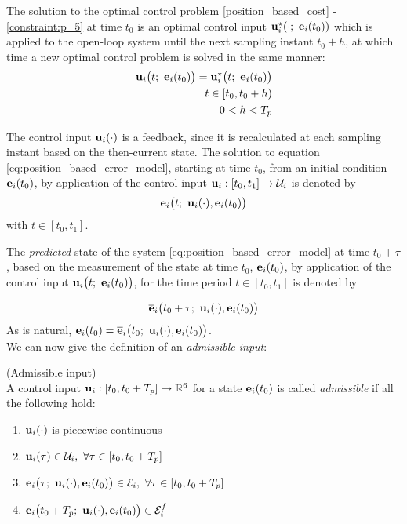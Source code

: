 The solution to the optimal control problem \eqref{position_based_cost} -
\eqref{constraint:p_5} at time $t_0$ is an optimal control input
$\bm{\mathbf{u}}_i^{\star}(\cdot;\ \bm{\mathbf{e}}_i(t_0))$ which
is applied to the open-loop system until the next sampling instant $t_0 + h$,
at which time a new optimal control problem is solved in the same manner:
\begin{align}
  \vect{u}_i\big(t;\ \vect{e}_i(t_0)\big) = \vect{u}_i^{\star}\big(t;\ \vect{e}_i(t_0)\big) \label{eq:position_based_optimal_u} \\
  t \in [t_0, t_0 + h) \nonumber \\
  0 < h < T_p \nonumber
\end{align}

The control input $\bm{\mathbf{u}}_i(\cdot)$ is a feedback, since it is
recalculated at each sampling instant based on the then-current state. The
solution to equation \eqref{eq:position_based_error_model}, starting at time
$t_0$, from an initial condition $\bm{\mathbf{e}}_i(t_0)$, by application of the
control input $\bm{\mathbf{u}}_i : [t_0, t_1] \to \mathcal{U}_i$ is denoted by
$$\bm{\mathbf{e}}_i\big(t;\ \bm{\mathbf{u}}_i(\cdot), \bm{\mathbf{e}}_i(t_0)\big)$$
with $t \in [t_0, t_1]$.

The \textit{predicted} state of the system \eqref{eq:position_based_error_model}
at time $t_0 + \tau$, based on the measurement of the state at time
$t_0$, $\bm{\mathbf{e}}_i(t_0)$, by application of the control input
$\vect{u}_i\big(t;\ \vect{e}_i(t_0)\big)$, for the time period $t \in [t_0, t_1]$
is denoted by

\begin{align}
  \overline{\bm{\mathbf{e}}}_i\big(t_0 + \tau;\ \bm{\mathbf{u}}_i(\cdot), \bm{\mathbf{e}}_i(t_0)\big) \label{eq:position_based_predicted_error_0}
\end{align}
As is natural,
$\vect{e}_i(t_0) = \overline{\vect{e}}_i\big(t_0;\ \vect{u}_i(\cdot), \vect{e}_i(t_0)\big)$.\\

We can now give the definition of an \textit{admissible input}:

\begin{bw_box}
\begin{definition} (Admissible input)\\

  A control input $\bm{\mathbf{u}}_i : [t_0, t_0 + T_p] \to \mathbb{R}^6$ for a state
  $\bm{\mathbf{e}}_i(t_0)$ is called \textit{admissible} if all the following hold:

  \begin{enumerate}
    \item $\bm{\mathbf{u}}_i(\cdot)$ is piecewise continuous
    \item $\vect{u}_i(\tau) \in \mathcal{U}_i,\ \forall \tau \in [t_0, t_0 + T_p]$
    \item $\vect{e}_i\big(\tau;\ \vect{u}_i(\cdot), \vect{e}_i(t_0)\big) \in \mathcal{E}_i,\ \forall \tau \in [t_0, t_0 + T_p]$
    \item $\vect{e}_i\big(t_0 + T_p;\ \vect{u}_i(\cdot), \vect{e}_i(t_0)\big) \in \mathcal{E}_i^f$
  \end{enumerate}

\end{definition}
\end{bw_box}


